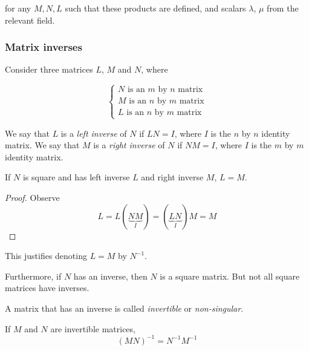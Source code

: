 \documentclass{../../template/note}
\begin{document}
    for any \(M, N, L\) such that these products are defined, and scalars \(\lambda\), \(\mu\) from the relevant field.

    \subsubsection{Matrix inverses}

    Consider three matrices \(L\), \(M\) and \(N\), where

    \[
        \begin{cases}
            N \text{ is an } m \text{ by } n \text{ matrix} \\
            M \text{ is an } n \text{ by } m \text{ matrix} \\
            L \text{ is an } n \text{ by } m \text{ matrix}
        \end{cases}
    \]
    
    \begin{definition}
        We say that \(L\) is a \emph{left inverse} of \(N\) if \(LN = I\), where \(I\) is the \(n\) by \(n\) identity matrix. We say that \(M\) is a \emph{right inverse} of \(N\) if \(NM = I\), where \(I\) is the \(m\) by \(m\) identity matrix.
    \end{definition}
    
    \begin{proposition}
        If \(N\) is square and has left inverse \(L\) and right inverse \(M\), \(L = M\).
    \end{proposition}
    
    \begin{proof}
        Observe
        \[
            L = L(\underbrace{NM}_I) = (\underbrace{LN}_I)M = M
        \]
    \end{proof}
    This justifies denoting \(L = M\) by \(N^{-1}\).

    \begin{remark}
        Furthermore, if \(N\) has an inverse, then \(N\) is a square matrix. But not all square matrices have inverses.
    \end{remark}
    
    \begin{definition}
        A matrix that has an inverse is called \emph{invertible} or \emph{non-singular}.
    \end{definition}
    
    \begin{proposition}
        If \(M\) and \(N\) are invertible matrices,
        \[
            (MN)^{-1} = N^{-1}M^{-1}
        \]
    \end{proposition}
    
\end{document}
